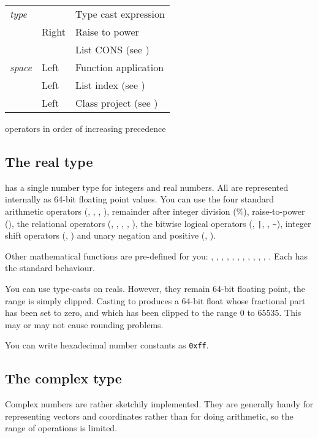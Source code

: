 \begin{tab2}
\begin{center}
\begin{tabular}{||l|l|l||}
\ct{(}\emph{type}\ct{)}	& 			& Type cast expression \\
\ct{**}			& Right			& Raise to power \\
\ct{:}			& 			& List CONS
						  (see \pref{sec:listsyntax}) \\
\emph{space}		& Left			& Function application \\
\ct{?}			& Left			& List index 
						  (see \pref{sec:listsyntax}) \\
\ct{.}			& Left			& Class project 
						  (see \pref{sec:class}) \\
\hline
\end{tabular}
\end{center}
\caption{\nip{} operators in order of increasing precedence}
\end{tab2}

\subsection{The real type}

\nip{} has a single number type for integers and real numbers. All are
represented internally as 64-bit floating point values. You can use the four
standard arithmetic operators (\ct{+}, \ct{-}, \ct{*}, \ct{/}), remainder
after integer division (\%), raise-to-power (\ct{**}), the relational
operators (\ct{<}, \ct{<=}, \ct{>}, \ct{>=}, \ct{==}), the bitwise logical
operators (\ct{\&}, \verb+|+, \rtp{}, \verb+~+), integer shift operators
(\ct{<<}, \ct{>>}) and unary negation and positive (\ct{-}, \ct{+}).

Other mathematical functions are pre-defined for you:  , ,
, , , , , , ,
, , . Each has the standard behaviour.

You can use type-casts on reals. However, they remain 64-bit floating point,
the range is simply clipped. Casting to  produces a 64-bit
float whose fractional part has been set to zero, and which has been
clipped to the range 0 to 65535. This may or may not cause rounding problems.

You can write hexadecimal number constants as \verb"0xff".

\subsection{The complex type}

Complex numbers are rather sketchily implemented. They are generally handy for
representing vectors and coordinates rather than for doing arithmetic, so the
range of operations is limited.

